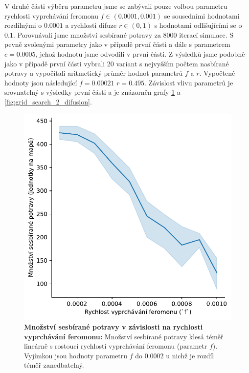 \documentclass[10pt,a4paper,twocolumn]{article}
\begin{document}
V druhé části výběru parametru jsme se zabývali pouze volbou parametru
rychlosti vyprchávání feromonu $f \in (0.0001, 0.001)$ 
se sousedními hodnotami rozdílnými o $0.0001$
a rychlosti difuze $r \in (0, 1)$ s hodnotami odlišujícími se o $0.1$. 
Porovnávali jsme množství sesbírané potravy za 
$8000$ iterací simulace. S pevně zvolenými parametry jako v případě 
první části a dále s parametrem $c = 0.0005$, jehož hodnotu jsme 
odvodili v první části. Z výsledků jsme podobně jako v případě 
první části vybrali 20 variant s nejvyšším počtem nasbírané potravy
a vypočítali aritmetický průměr hodnot parametrů $f$ a $r$. Vypočtené 
hodnoty jsou následující $f = 0.00021$ $r = 0.495$. Závislost vlivu 
parametrů je srovnatelný s výsledky první části a je znázorněn
grafy \ref{fig:grid_search_2_fade} a \ref{fig:grid_search_2_difusion}.


\begin{figure}[tb]
  \centering
  \includegraphics[width=0.9\linewidth]{images/grid_search_2_fade.pdf}
  \caption{\textbf{Množství sesbírané potravy v závislosti na rychlosti vyprchávání feromonu:}
  Množství sesbírané potravy klesá téměř lineárně s rostoucí 
  rychlostí vyprchávání feromonu (parametr $f$). Vyjímkou jsou hodnoty
  parametru $f$ do $0.0002$ u nichž je rozdíl téměř zanedbatelný.}
  \label{fig:grid_search_2_fade}
\end{figure}
\end{document}
